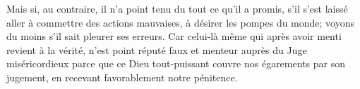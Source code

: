 Mais si, au contraire, il n’a point tenu du tout ce qu’il a promis,
	s’il s’est laissé aller à commettre des actions mauvaises,
	à désirer les pompes du monde;
	voyons du moins s’il sait pleurer ses erreurs.
Car celui-là même qui après avoir menti revient à la vérité,
	n’est point réputé faux et menteur auprès du Juge miséricordieux
	parce que ce Dieu tout-puissant couvre nos égarements par son jugement,
	en recevant favorablement notre pénitence.

